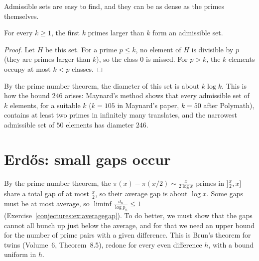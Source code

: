 Admissible sets are easy to find, and they can be as dense as the primes themselves.

\begin{proposition}\label{conjectures:prop:firstprimes}
For every $k\ge1$, the first $k$ primes larger than $k$ form an admissible set.
\end{proposition}
\begin{proof}
Let $H$ be this set. For a prime $p\le k$, no element of $H$ is divisible by $p$ (they are primes larger than $k$), so the class $0$ is missed. For
$p>k$, the $k$ elements occupy at most $k<p$ classes.
\end{proof}

By the prime number theorem, the diameter of this set is about $k\log k$. This is how the bound $246$ arises: Maynard's method shows that every
admissible set of $k$ elements, for a suitable $k$ ($k=105$ in Maynard's paper, $k=50$ after Polymath), contains at least two primes in infinitely many
translates, and the narrowest admissible set of $50$ elements has diameter $246$.

\section{Erd\H{o}s: small gaps occur}

By the prime number theorem, the $\pi(x)-\pi(x/2)\sim\frac x{2\log x}$ primes in $]\frac x2,x]$ share a total gap of at most $\frac x2$, so their average
gap is about $\log x$. Some gaps must be at most average, so $\liminf\frac{d_n}{\log p_n}\le1$ (Exercise~\ref{conjectures:ex:averagegap}). To do better, we must
show that the gaps cannot all bunch up just below the average, and for that we need an upper bound for the number of prime pairs with a given
difference. This is Brun's theorem for twins (Volume~6, Theorem~8.5), redone for every even difference $h$, with a bound uniform in $h$.

